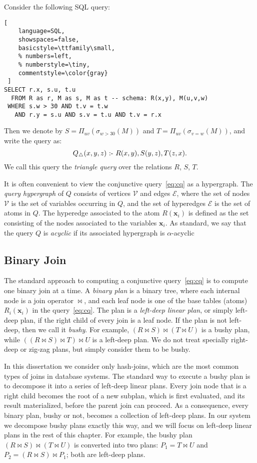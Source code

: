 \begin{ex} \label{ex:triangle} Consider the following SQL query:
\begin{lstlisting}[
    language=SQL,
    showspaces=false,
    basicstyle=\ttfamily\small,
    % numbers=left,
    % numberstyle=\tiny,
    commentstyle=\color{gray}
 ]
SELECT r.x, s.u, t.u
  FROM R as r, M as s, M as t -- schema: R(x,y), M(u,v,w)
 WHERE s.w > 30 AND t.v = t.w
   AND r.y = s.u AND s.v = t.u AND t.v = r.x
\end{lstlisting}
%
Then we denote by $S = \Pi_{uv}(\sigma_{w>30}(M))$ and $T =
\Pi_{uv}(\sigma_{v=w}(M))$, and write the query as:
$$Q_{\triangle}(x,y,z) \text{ :- } R(x, y), S(y,z), T(z, x).$$
%
We call this query the \emph{triangle query} over the relations $R$, $S$,
$T$.
\end{ex}

It is often convenient to view the conjunctive query~\eqref{eq:cq} as
a hypergraph.  The \emph{query hypergraph} of $Q$ consists of vertices
$\mathcal{V}$ and edges $\mathcal{E}$, where the set of nodes
$\mathcal{V}$ is the set of variables occurring in $Q$, and the set of
hyperedges $\mathcal{E}$ is the set of atoms in $Q$.  The hyperedge
associated to the atom $R(\bm x_i)$ is defined as the set consisting
of the nodes associated to the variables $\bm x_i$.  As standard, we
say that the query $Q$ is {\em acyclic} if its associated hypergraph
is $\alpha$-acyclic~\cite{DBLP:journals/jacm/Fagin83}


\subsection{Binary Join}\label{sec:binary-join}

The standard approach to computing a conjunctive query~\eqref{eq:cq} is
to compute one binary join at a time.  A {\em binary plan} is a binary
tree, where each internal node is a join operator $\Join$, and each
leaf node is one of the base tables (atoms) $R_i(\bm x_i)$ in the
query~\eqref{eq:cq}.  The plan is a \emph{left-deep linear plan}, or
simply left-deep plan, if the right child of every join is a leaf
node.  If the plan is not left-deep, then we call it \emph{bushy}.
For example, $(R \Join S) \Join (T \Join U)$ is a bushy plan, while
$((R \Join S) \Join T) \Join U$ is a left-deep plan.  We do not treat
specially right-deep or zig-zag plans, but simply consider them to be
bushy.

In this dissertation we consider only hash-joins, which are the most
common types of joins in database systems. 
The standard way to execute a bushy plan is to
decompose it into a series of left-deep linear plans.  Every join node
that is a right child becomes the root of a new subplan, which is
first evaluated, and its result materialized, before the parent join
can proceed.  As a consequence, every binary plan, bushy or not,
becomes a collection of left-deep plans. 
In our system we decompose bushy
plans exactly this way, and we will focus on left-deep linear
plans in the rest of this chapter.  For example, the bushy plan
$(R \Join S) \Join (T \Join U)$ is converted into two plans:
$P_1 = T \Join U$ and $P_2 = (R \Join S) \Join P_1$; both are
left-deep plans.

